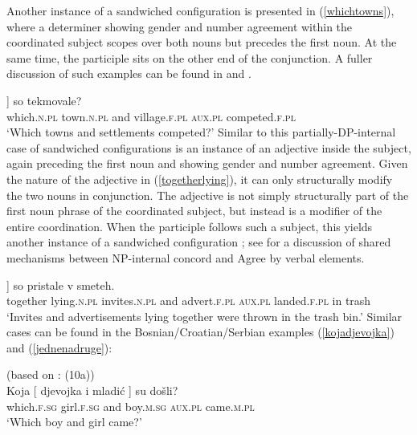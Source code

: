 \documentclass[output=paper
,modfonts
,nonflat]{langsci/langscibook}
\begin{document}
Another instance of a sandwiched configuration is presented in (\ref{whichtowns}), where a determiner showing gender and number agreement within the coordinated subject scopes over both nouns but precedes the first noun. At the same time, the participle sits on the other end of the conjunction. A fuller discussion of such examples can be found in \cite{begovicaljovic:15} and \cite{aljovicbegovic:16}. 

\ea \label{whichtowns}
\gll [ Katera [ mesta in vasi ]] so tekmovale?  \\
{} which.\textsc{n.pl} {} town.\textsc{n.pl} and village.\textsc{f.pl} {} \textsc{aux.pl} competed.\textsc{f.pl}\\
\glt `Which towns and settlements competed?'
\z
Similar to this partially-DP-internal case of sandwiched configurations is an instance of an adjective inside the subject, again preceding the first noun and showing gender and number agreement. Given the nature of the adjective in (\ref{togetherlying}), it can only structurally modify the two nouns in conjunction. The adjective is not simply  structurally part of the first noun phrase of the coordinated subject, but instead is a modifier of the entire coordination. When the participle follows such a subject, this yields another instance of a sandwiched configuration \citep{marusicetalnels:15}; see  for a discussion of shared mechanisms between NP-internal concord and Agree by verbal elements.

\ea \label{togetherlying}
\gll [ Skupaj  ležeča   [ vabila         in    reklame ]] so      pristale     v  smeteh. \\
{} together lying.\textsc{n.pl} {} invites.\textsc{n.pl} and advert.\textsc{f.pl} {} \textsc{aux.pl} landed.\textsc{f.pl} in trash\\
\glt `Invites and advertisements lying together were thrown in the trash bin.'
\z
Similar cases can be found in the Bosnian/Croatian/Serbian examples (\ref{kojadjevojka}) and (\ref{jednenadruge}):

\ea \label{kojadjevojka}
(based on \citealt{aljovicbegovic:16}: (10a))\\
\gll Koja [ djevojka i mladić ] su došli? \\
which.\textsc{f.sg} {} girl.\textsc{f.sg} and boy.\textsc{m.sg} {} \textsc{aux.pl} came.\textsc{m.pl}\\
\glt `Which boy and girl came?' 
\z
\end{document}

